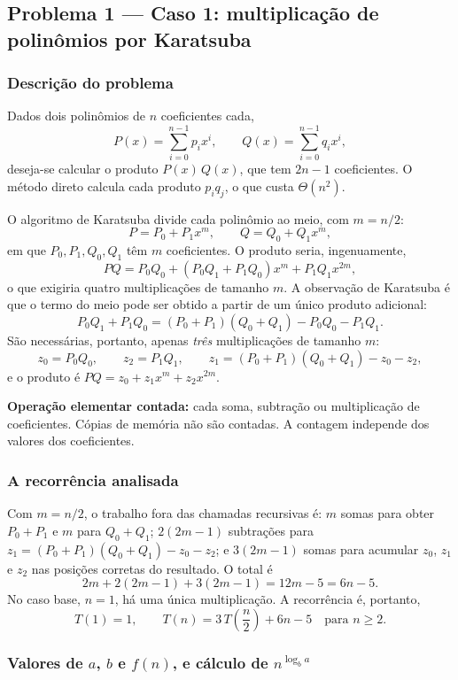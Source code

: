 \documentclass[11pt,a4paper]{article}
\begin{document}
\subsection{Problema 1 --- Caso 1: multiplicação de polinômios por Karatsuba}

\subsubsection{Descrição do problema}

Dados dois polinômios de $n$ coeficientes cada,
\[
P(x)=\sum_{i=0}^{n-1}p_i x^i,\qquad Q(x)=\sum_{i=0}^{n-1}q_i x^i,
\]
deseja-se calcular o produto $P(x)\,Q(x)$, que tem $2n-1$ coeficientes. O método direto calcula cada produto $p_i q_j$, o que custa $\Theta(n^2)$.

O algoritmo de Karatsuba divide cada polinômio ao meio, com $m=n/2$:
\[
P=P_0+P_1x^m,\qquad Q=Q_0+Q_1x^m,
\]
em que $P_0,P_1,Q_0,Q_1$ têm $m$ coeficientes. O produto seria, ingenuamente,
\[
PQ=P_0Q_0+(P_0Q_1+P_1Q_0)x^m+P_1Q_1x^{2m},
\]
o que exigiria quatro multiplicações de tamanho $m$. A observação de Karatsuba é que o termo do meio pode ser obtido a partir de um único produto adicional:
\[
P_0Q_1+P_1Q_0=(P_0+P_1)(Q_0+Q_1)-P_0Q_0-P_1Q_1.
\]
São necessárias, portanto, apenas \emph{três} multiplicações de tamanho $m$:
\[
z_0=P_0Q_0,\qquad z_2=P_1Q_1,\qquad z_1=(P_0+P_1)(Q_0+Q_1)-z_0-z_2,
\]
e o produto é $PQ=z_0+z_1x^m+z_2x^{2m}$.

\textbf{Operação elementar contada:} cada soma, subtração ou multiplicação de coeficientes. Cópias de memória não são contadas. A contagem independe dos valores dos coeficientes.

\subsubsection{A recorrência analisada}

Com $m=n/2$, o trabalho fora das chamadas recursivas é: $m$ somas para obter $P_0+P_1$ e $m$ para $Q_0+Q_1$; $2(2m-1)$ subtrações para $z_1=(P_0+P_1)(Q_0+Q_1)-z_0-z_2$; e $3(2m-1)$ somas para acumular $z_0$, $z_1$ e $z_2$ nas posições corretas do resultado. O total é
\[
2m+2(2m-1)+3(2m-1)=12m-5=6n-5.
\]
No caso base, $n=1$, há uma única multiplicação. A recorrência é, portanto,
\begin{equation}
T(1)=1,\qquad T(n)=3\,T\!\left(\frac n2\right)+6n-5\quad\text{para }n\ge2.
\label{eq:rec1}
\end{equation}

\subsubsection{Valores de $a$, $b$ e $f(n)$, e cálculo de $n^{\log_b a}$}
\end{document}
